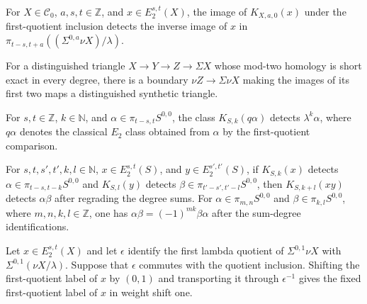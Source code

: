 \begin{theorem}
\label{frontier:AdamsSynthetic:791f3c0e6a4a}
For $X\in\mathcal C_0$, $a,s,t\in\mathbb Z$, and $x\in E_2^{s,t}(X)$, the image of $K_{X,a,0}(x)$ under the first-quotient inclusion detects the inverse image of $x$ in $\pi_{t-s,t+a}((\Sigma^{0,a}\nu X)/\lambda)$.

For a distinguished triangle $X\to Y\to Z\to\Sigma X$ whose mod-two homology is short exact in every degree, there is a boundary $\nu Z\to\Sigma\nu X$ making the images of its first two maps a distinguished synthetic triangle.

For $s,t\in\mathbb Z$, $k\in\mathbb N$, and $\alpha\in\pi_{t-s,t}S^{0,0}$, the class $K_{S,k}(q\alpha)$ detects $\lambda^k\alpha$, where $q\alpha$ denotes the classical $E_2$ class obtained from $\alpha$ by the first-quotient comparison.

For $s,t,s',t',k,l\in\mathbb N$, $x\in E_2^{s,t}(S)$, and $y\in E_2^{s',t'}(S)$, if $K_{S,k}(x)$ detects $\alpha\in\pi_{t-s,t-k}S^{0,0}$ and $K_{S,l}(y)$ detects $\beta\in\pi_{t'-s',t'-l}S^{0,0}$, then $K_{S,k+l}(xy)$ detects $\alpha\beta$ after regrading the degree sums. For $\alpha\in\pi_{m,n}S^{0,0}$ and $\beta\in\pi_{k,l}S^{0,0}$, where $m,n,k,l\in\mathbb Z$, one has $\alpha\beta=(-1)^{mk}\beta\alpha$ after the sum-degree identifications.
\end{theorem}


\begin{theorem}
\label{frontier:AdamsSynthetic:894dd8ba400f}
Let $x\in E_2^{s,t}(X)$ and let $\epsilon$ identify the first lambda quotient of $\Sigma^{0,1}\nu X$ with $\Sigma^{0,1}(\nu X/\lambda)$. Suppose that $\epsilon$ commutes with the quotient inclusion. Shifting the first-quotient label of $x$ by $(0,1)$ and transporting it through $\epsilon^{-1}$ gives the fixed first-quotient label of $x$ in weight shift one.
\end{theorem}

